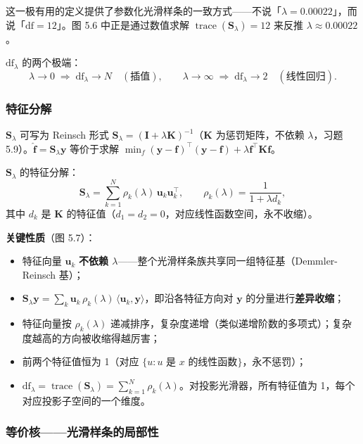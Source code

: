 这一极有用的定义提供了参数化光滑样条的一致方式——不说「$\lambda = 0.00022$」，而说「$\mathrm{df}=12$」。图 5.6 中正是通过数值求解 $\operatorname{trace}(\mathbf{S}_\lambda) = 12$ 来反推 $\lambda \approx 0.00022$。

$\mathrm{df}_\lambda$ 的两个极端：
\[
\lambda \to 0 \;\Longrightarrow\; \mathrm{df}_\lambda \to N \quad (\text{插值}), \qquad
\lambda \to \infty \;\Longrightarrow\; \mathrm{df}_\lambda \to 2 \quad (\text{线性回归}).
\]

\subsubsection{特征分解}

$\mathbf{S}_\lambda$ 可写为 Reinsch 形式 $\mathbf{S}_\lambda = (\mathbf{I} + \lambda\mathbf{K})^{-1}$（$\mathbf{K}$ 为惩罚矩阵，不依赖 $\lambda$，习题 5.9）。$\hat{\mathbf{f}} = \mathbf{S}_\lambda\mathbf{y}$ 等价于求解 $\min_f (\mathbf{y}-\mathbf{f})^\top(\mathbf{y}-\mathbf{f}) + \lambda \mathbf{f}^\top\mathbf{K}\mathbf{f}$。

$\mathbf{S}_\lambda$ 的特征分解：
\[
\mathbf{S}_\lambda = \sum_{k=1}^{N} \rho_k(\lambda)\,\mathbf{u}_k\mathbf{u}_k^\top, \qquad
\rho_k(\lambda) = \frac{1}{1 + \lambda d_k},
\]
其中 $d_k$ 是 $\mathbf{K}$ 的特征值（$d_1 = d_2 = 0$，对应线性函数空间，永不收缩）。

\textbf{关键性质}（图 5.7）：
\begin{itemize}
    \item 特征向量 $\mathbf{u}_k$ \textbf{不依赖 $\lambda$}——整个光滑样条族共享同一组特征基（Demmler-Reinsch 基）；
    \item $\mathbf{S}_\lambda\mathbf{y} = \sum_k \mathbf{u}_k\,\rho_k(\lambda)\,\langle\mathbf{u}_k,\mathbf{y}\rangle$，即沿各特征方向对 $\mathbf{y}$ 的分量进行\textbf{差异收缩}；
    \item 特征向量按 $\rho_k(\lambda)$ 递减排序，复杂度递增（类似递增阶数的多项式）；复杂度越高的方向被收缩得越厉害；
    \item 前两个特征值恒为 1（对应 $\{u: u\text{ 是 }x\text{ 的线性函数}\}$，永不惩罚）；
    \item $\mathrm{df}_\lambda = \operatorname{trace}(\mathbf{S}_\lambda) = \sum_{k=1}^{N} \rho_k(\lambda)$。对投影光滑器，所有特征值为 1，每个对应投影子空间的一个维度。
\end{itemize}

\subsubsection{等价核——光滑样条的局部性}

